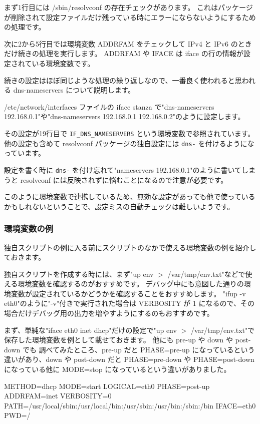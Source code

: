 \documentclass[mingoth,a4paper,twoside]{jsarticle}
\begin{document}
まず1行目には /sbin/resolvconf の存在チェックがあります。
これはパッケージが削除されて設定ファイルだけ残っている時にエラーにならないようにするための処理です。

次に2から5行目では環境変数 ADDRFAM をチェックして IPv4 と IPv6 のときだけ続きの処理を実行します。
ADDRFAM や IFACE は iface の行の情報が設定されている環境変数です。

続きの設定はほぼ同じような処理の繰り返しなので、一番良く使われると思われる dns-nameservers について説明します。

/etc/network/interfaces ファイルの iface stanza で"dns-nameservers 192.168.0.1"や"dns-nameservers 192.168.0.1 192.168.0.2"のように設定します。

その設定が19行目で \verb+IF_DNS_NAMESERVERS+ という環境変数で参照されています。
他の設定も含めて resolvconf パッケージの独自設定には \verb+dns-+ を付けるようになっています。

設定を書く時に \verb+dns-+ を付け忘れて"nameservers 192.168.0.1"のように書いてしまうと resolvconf には反映されずに悩むことになるので注意が必要です。

このように環境変数で連携しているため、無効な設定があっても他で使っているかもしれないということで、設定ミスの自動チェックは難しいようです。

\subsubsection{環境変数の例}
独自スクリプトの例に入る前にスクリプトのなかで使える環境変数の例を紹介しておきます。

独自スクリプトを作成する時には、まず"up env $>$ /var/tmp/env.txt"などで使える環境変数を確認するのがおすすめです。
デバッグ中にも意図した通りの環境変数が設定されているかどうかを確認することをおすすめします。
"ifup -v eth0"のように"-v"付きで実行された場合は VERBOSITY が 1 になるので、その場合だけデバッグ用の出力を増やすようにするのもおすすめです。

まず、単純な"iface eth0 inet dhcp"だけの設定で"up env $>$ /var/tmp/env.txt"で保存した環境変数を例として載せておきます。
他にも pre-up や down や post-down でも 調べてみたところ、pre-up だと PHASE=pre-up になっているという違いがあり、down や post-down だと PHASE=pre-down や PHASE=post-down になっている他に MODE=stop になっているという違いがありました。

\begin{commandline}
METHOD=dhcp
MODE=start
LOGICAL=eth0
PHASE=post-up
ADDRFAM=inet
VERBOSITY=0
PATH=/usr/local/sbin:/usr/local/bin:/usr/sbin:/usr/bin:/sbin:/bin
IFACE=eth0
PWD=/
\end{commandline}
\end{document}
